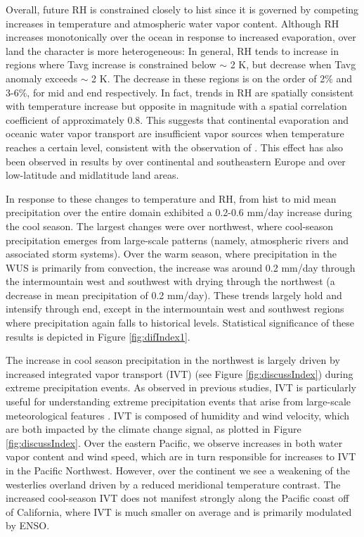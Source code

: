 Overall, future RH is constrained closely to {\textsf{hist}} since it is governed by competing increases in temperature and atmospheric water vapor content. Although RH increases monotonically over the ocean in response to increased evaporation, over land the character is more heterogeneous:  In general, RH tends to increase in regions where Tavg increase is constrained below $\sim$ 2 K, but decrease when Tavg anomaly exceeds $\sim$ 2 K. The decrease in these regions is on the order of 2$\%$ and 3-6$\%$, for \textsf{mid} and \textsf{end} respectively.  In fact, trends in RH are spatially consistent with temperature increase but opposite in magnitude with a spatial correlation coefficient of approximately 0.8. This suggests that continental evaporation and oceanic water vapor transport are insufficient vapor sources when temperature reaches a certain level, consistent with the observation of \cite{joshi2008mechanisms}.  This effect has also been observed in results by \cite{rowell2006causes} over continental and southeastern Europe and \cite{simmons2010low} over low-latitude and midlatitude land areas.


In response to these changes to temperature and RH, from \textsf{hist} to \textsf{mid} mean precipitation over the entire domain exhibited a 0.2-0.6 mm/day increase during the cool season.  The largest changes were over northwest, where cool-season precipitation emerges from large-scale patterns (namely, atmospheric rivers and associated storm systems)\cite{trenberth2003changing, neiman2008meteorological}.  Over the warm season, where precipitation in the WUS is primarily from convection, the increase was around 0.2 mm/day through the intermountain west and southwest with drying through the northwest (a decrease in mean precipitation of 0.2 mm/day).  These trends largely hold and intensify through \textsf{end}, except in the intermountain west and southwest regions where precipitation again falls to historical levels.  Statistical significance of these results is depicted in Figure \ref{fig:difIndex1}.


The increase in cool season precipitation in the northwest is largely driven by increased integrated vapor transport (IVT) (see Figure \ref{fig:discussIndex}) during extreme precipitation events.  As observed in previous studies, IVT is particularly useful for understanding extreme precipitation events that arise from large-scale meteorological features \cite{ralph2004satellite, leung2009atmospheric, dettinger2011climate}.  IVT is composed of humidity and wind velocity, which are both impacted by the climate change signal, as plotted in Figure \ref{fig:discussIndex}. Over the eastern Pacific, we observe increases in both water vapor content and wind speed, which are in turn responsible for increases to IVT in the Pacific Northwest.  However, over the continent we see a weakening of the westerlies overland driven by a reduced meridional temperature contrast.  The increased cool-season IVT does not manifest strongly along the Pacific coast off of California, where IVT is much smaller on average and is primarily modulated by ENSO.

